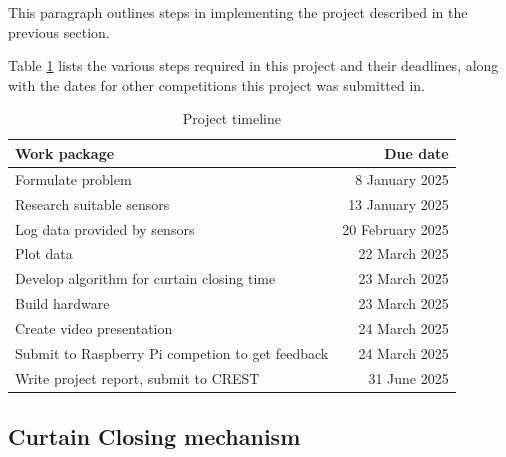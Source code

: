 \documentclass[a4paper,12pt]{article}
\begin{document}
This paragraph outlines steps in implementing the project described in the previous section.

Table \ref{tab:projtimeline} lists the various steps required in this project and their deadlines, along with the dates for other competitions this project was submitted in.

\begin{table}[h!]
    \caption{Project timeline}
    \begin{tabular}{l | r}
        Work package & Due date \\
        \hline
        Formulate problem &  8 January 2025 \\
        Research suitable sensors & 13 January 2025 \\
        Log data provided by sensors & 20 February 2025 \\
        Plot data & 22 March 2025 \\
        Develop algorithm for curtain closing time & 23 March 2025 \\
        Build hardware & 23 March 2025 \\
        Create video presentation & 24 March 2025 \\
        Submit to Raspberry Pi competion to get feedback & 24 March 2025 \\
        Write project report, submit to CREST &  31 June 2025\\
    \end{tabular}
    \label{tab:projtimeline}
\end{table}

\subsection{Curtain Closing mechanism}
\end{document}
